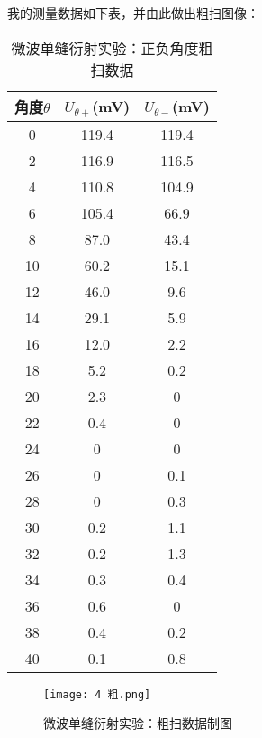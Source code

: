 \documentclass[11pt]{article}
\begin{document}
我的测量数据如下表，并由此做出粗扫图像：
\begin{table}[H]
    \centering
    \begin{tabular}{ccc}
    \toprule
        角度$\theta $ & $U_{\theta +}$(mV) & $U_{\theta -}$(mV) \\ \midrule
        0 & 119.4 & 119.4 \\ 
        2 & 116.9 & 116.5 \\ 
        4 & 110.8 & 104.9 \\ 
        6 & 105.4 & 66.9 \\ 
        8 & 87.0 & 43.4 \\ 
        10 & 60.2 & 15.1 \\ 
        12 & 46.0 & 9.6 \\ 
        14 & 29.1 & 5.9 \\ 
        16 & 12.0 & 2.2 \\ 
        18 & 5.2 & 0.2 \\ 
        20 & 2.3 & 0 \\ 
        22 & 0.4 & 0 \\ 
        24 & 0 & 0 \\ 
        26 & 0 & 0.1 \\ 
        28 & 0 & 0.3 \\ 
        30 & 0.2 & 1.1 \\ 
        32 & 0.2 & 1.3 \\ 
        34 & 0.3 & 0.4 \\ 
        36 & 0.6 & 0 \\ 
        38 & 0.4 & 0.2 \\ 
        40 & 0.1 & 0.8 \\ \bottomrule
    \end{tabular}
    \caption{微波单缝衍射实验：正负角度粗扫数据}
\end{table}

\begin{figure}[H]
    \centering
    \texttt{[image: 4 粗.png]}
    \caption{微波单缝衍射实验：粗扫数据制图}
\end{figure}
\end{document}
